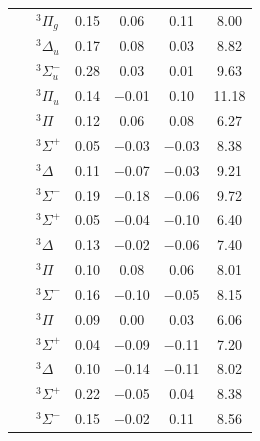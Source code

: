 {\begin{table}[h!]
\begin{threeparttable}
\begin{tabular}{clcccc}
                & \({}^3\Pi_g\)        &
                \( \)0.15 & \( \)0.06 & \( \)0.11 &  8.00 \\\
                & \({}^3\Delta_u\)     &
                \( \)0.17 & \( \)0.08 & \( \)0.03 &  8.82 \\\
                & \({}^3\Sigma_u^-\)   &
                \( \)0.28 & \( \)0.03 & \( \)0.01 &  9.63 \\\
                & \({}^3\Pi_u\)        &
                \( \)0.14 & \(-\)0.01 & \( \)0.10 & 11.18 \\\
                \ce{CO}                            
                & \({}^3\Pi\)          &
                \( \)0.12 & \( \)0.06 & \( \)0.08 &  6.27 \\\
                & \({}^3\Sigma^+\)     &
                \( \)0.05 & \(-\)0.03 & \(-\)0.03 &  8.38 \\\
                & \({}^3\Delta\)       &
                \( \)0.11 & \(-\)0.07 & \(-\)0.03 &  9.21 \\\
                & \({}^3\Sigma^-\)     &
                \( \)0.19 & \(-\)0.18 & \(-\)0.06 &  9.72 \\\
                \ce{HCN}                           
                & \({}^3\Sigma^+\)     &
                \( \)0.05 & \(-\)0.04 & \(-\)0.10 &  6.40 \\
                & \({}^3\Delta\)       &
                \( \)0.13 & \(-\)0.02 & \(-\)0.06 &  7.40 \\
                & \({}^3\Pi\)          &
                \( \)0.10 & \( \)0.08 & \( \)0.06 &  8.01 \\
                & \({}^3\Sigma^-\)     &
                \( \)0.16 & \(-\)0.10 & \(-\)0.05 &  8.15 \\
                \ce{HNC}                                                      
                & \({}^3\Pi\)          &
                \( \)0.09 & \( \)0.00 & \( \)0.03 &  6.06 \\
                & \({}^3\Sigma^+\)     &
                \( \)0.04 & \(-\)0.09 & \(-\)0.11 &  7.20 \\
                & \({}^3\Delta\)       &
                \( \)0.10 & \(-\)0.14 & \(-\)0.11 &  8.02 \\
                & \({}^3\Sigma^+\)     &
                \( \)0.22 & \(-\)0.05 & \( \)0.04 &  8.38 \\
                & \({}^3\Sigma^-\)     &
                \( \)0.15 & \(-\)0.02 & \( \)0.11 &  8.56 \\

\end{tabular}
\end{threeparttable}
\end{table}}
